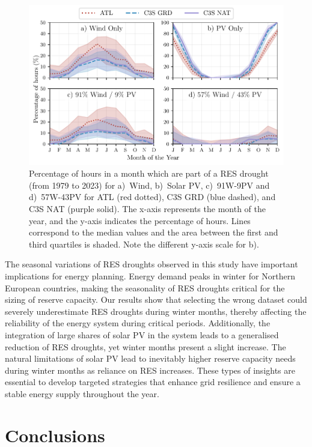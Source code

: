 \documentclass[preprint, 12pt]{elsarticle}
\begin{document}
\begin{figure}[!ht]
	\centering
	\includegraphics[width=\textwidth]{droughts_seasonality.pdf}
	\caption{Percentage of hours in a month which are part of a RES drought (from 1979 to 2023) for a)~Wind, b)~Solar PV, c)~91W-9PV and d)~57W-43PV for ATL (red dotted), C3S GRD (blue dashed), and C3S NAT (purple solid). The x-axis represents the month of the year, and the y-axis indicates the percentage of hours. Lines correspond to the median values and the area between the first and third quartiles is shaded. Note the different y-axis scale for b).}
	\label{fig:res_droughts_seasonality}
\end{figure}

The seasonal variations of RES droughts observed in this study have important implications for energy planning. Energy demand peaks in winter for Northern European countries, making the seasonality of RES droughts critical for the sizing of reserve capacity. Our results show that selecting the wrong dataset could severely underestimate RES droughts during winter months, thereby affecting the reliability of the energy system during critical periods. Additionally, the integration of large shares of solar PV in the system leads to a generalised reduction of RES droughts, yet winter months present a slight increase. The natural limitations of solar PV lead to inevitably higher reserve capacity needs during winter months as reliance on RES increases. These types of insights are essential to develop targeted strategies that enhance grid resilience and ensure a stable energy supply throughout the year.


\section{Conclusions}
\label{sec:conclusions}
\end{document}
